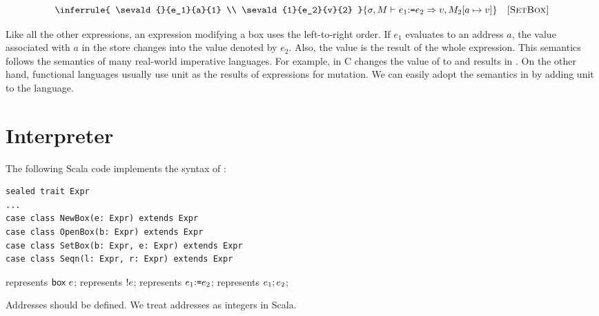 
\vspace{-1em}

\[
  \inferrule
  {
    \sevald{}{e_1}{a}{1} \\
    \sevald{1}{e_2}{v}{2}
  }
  { \seval{\sigma}{M}{\eset{e_1}{e_2}}{v}{M_2[a\mapsto v]} }
  \quad\textsc{[SetBox]}
\]

Like all the other expressions, an expression modifying a box uses the left-to-right
order. If $e_1$ evaluates to an address $a$, the value associated with $a$ in
the store changes into the value denoted by $e_2$. Also, the value is the result
of the whole expression. This semantics follows the semantics of many real-world
imperative languages. For example,  in C changes the value of
 to  and results in . On the other hand, functional
languages usually use unit as the results of expressions for mutation. We can
easily adopt the semantics in \lang by adding unit to the language.

\section{Interpreter}

The following Scala code implements the syntax of \lang:

\begin{verbatim}
sealed trait Expr
...
case class NewBox(e: Expr) extends Expr
case class OpenBox(b: Expr) extends Expr
case class SetBox(b: Expr, e: Expr) extends Expr
case class Seqn(l: Expr, r: Expr) extends Expr
\end{verbatim}

 represents $\textsf{box}\ e$;
 represents $!e$;
 represents $e_1{:}\texttt{=} e_2$;
 represents $e_1;e_2$;

Addresses should be defined. We treat addresses as integers in Scala.

